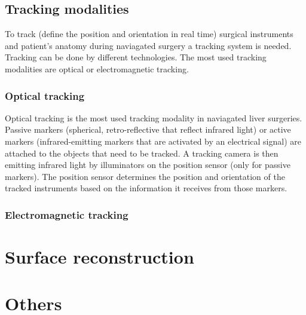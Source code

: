 \subsection{Tracking modalities}
To track (define the position and orientation in real time) surgical instruments
and patient's anatomy during naviagated surgery a tracking system is needed.
Tracking can be done by different technologies. The most used tracking
modalities are optical or electromagnetic tracking. 

\subsubsection{Optical tracking}
Optical tracking is the most used tracking modality in naviagated liver
surgeries. Passive markers (spherical, retro-reflective that reflect infrared
light) or active markers (infrared-emitting markers that are activated by an
electrical signal) \cite{wiles2004accuracy} are attached to the objects that
need to be tracked. A tracking camera is then emitting infrared light by illuminators
on the position sensor (only for passive markers). The position sensor
determines the position and orientation of the tracked instruments based on the
information it receives from those markers.  \cite{noauthor_polaris_nodate}
\subsubsection{Electromagnetic tracking}
\section{Surface reconstruction}
\section{Others}

\endinput
